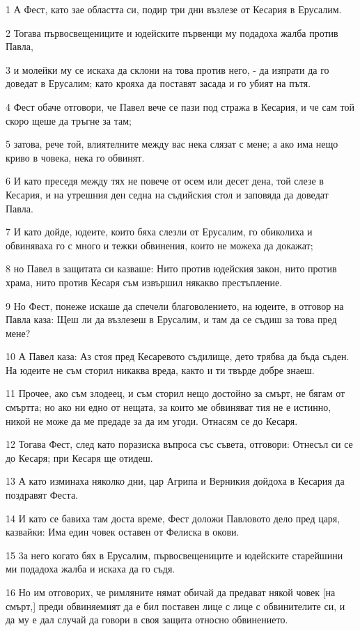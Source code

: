 \par 1 А Фест, като зае областта си, подир три дни възлезе от Кесария в Ерусалим.
\par 2 Тогава първосвещениците и юдейските първенци му подадоха жалба против Павла,
\par 3 и молейки му се искаха да склони на това против него, - да изпрати да го доведат в Ерусалим; като крояха да поставят засада и го убият на пътя.
\par 4 Фест обаче отговори, че Павел вече се пази под стража в Кесария, и че сам той скоро щеше да тръгне за там;
\par 5 затова, рече той, влиятелните между вас нека слязат с мене; а ако има нещо криво в човека, нека го обвинят.
\par 6 И като преседя между тях не повече от осем или десет дена, той слезе в Кесария, и на утрешния ден седна на съдийския стол и заповяда да доведат Павла.
\par 7 И като дойде, юдеите, които бяха слезли от Ерусалим, го обиколиха и обвиняваха го с много и тежки обвинения, които не можеха да докажат;
\par 8 но Павел в защитата си казваше: Нито против юдейския закон, нито против храма, нито против Кесаря съм извършил някакво престъпление.
\par 9 Но Фест, понеже искаше да спечели благоволението, на юдеите, в отговор на Павла каза: Щеш ли да възлезеш в Ерусалим, и там да се съдиш за това пред мене?
\par 10 А Павел каза: Аз стоя пред Кесаревото съдилище, дето трябва да бъда съден. На юдеите не съм сторил никаква вреда, както и ти твърде добре знаеш.
\par 11 Прочее, ако съм злодеец, и съм сторил нещо достойно за смърт, не бягам от смъртта; но ако ни едно от нещата, за които ме обвиняват тия не е истинно, никой не може да ме предаде за да им угоди. Отнасям се до Кесаря.
\par 12 Тогава Фест, след като поразиска въпроса със съвета, отговори: Отнесъл си се до Кесаря; при Кесаря ще отидеш.
\par 13 А като изминаха няколко дни, цар Агрипа и Верникия дойдоха в Кесария да поздравят Феста.
\par 14 И като се бавиха там доста време, Фест доложи Павловото дело пред царя, казвайки: Има един човек оставен от Фелиска в окови.
\par 15 3а него когато бях в Ерусалим, първосвещениците и юдейските старейшини ми подадоха жалба и искаха да го съдя.
\par 16 Но им отговорих, че римляните нямат обичай да предават някой човек [на смърт,] преди обвиняемият да е бил поставен лице с лице с обвинителите си, и да му е дал случай да говори в своя защита относно обвинението.

